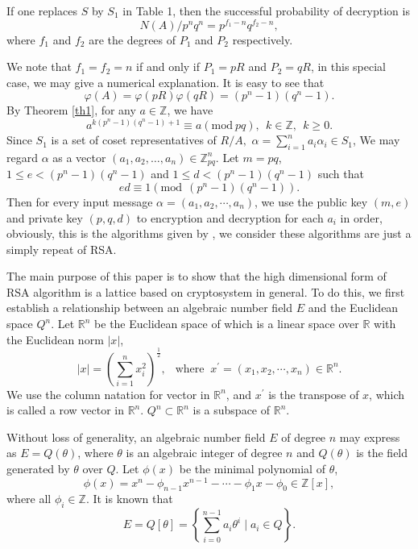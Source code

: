 \documentclass [11pt]{article}
\begin{document}
If one replaces $S$ by $S_{1}$ in Table 1, then the successful probability of  decryption is
\begin{equation}\label{1.6}
N(A) / p^{n} q^{n}=p^{f_{1}-n} q^{f_{2}-n},
\end{equation}
where  $f_{1}$ and $f_{2}$ are the  degrees  of $P_{1}$ and $P_{2}$ respectively.

We note that $f_{1}=f_{2}=n$ if and only if $P_{1}=p R$ and
$P_{2}=q R$, in this special case, we may give a numerical explanation. It is easy to see that
$$
\varphi(A)=\varphi(p R) \varphi(q R)=\left(p^{n}-1\right)\left(q^{n}-1\right).
$$
By Theorem \ref{th1}, for any $ a \in \mathbb{Z}$, we have
\begin{equation}\label{1.7}
a^{k\left(p^{n}-1\right)\left(q^{n}-1\right)+1} \equiv a (\text{mod}\ pq),\ \ k \in \mathbb{Z},\ \ k\geq 0.
\end{equation}
Since $S_{1}$ is a set of coset representatives of $R/A,$ $\alpha=\sum_{i=1}^{n}a_{i}\alpha_{i}\in S_{1}$,
We may regard  $\alpha$ as a vector  $\left(a_{1}, a_{2}, \ldots, a_{n}\right) \in \mathbb{Z}_{pq}^{n}$. Let $m =pq$, $1 \leq e<\left(p^{n}-1\right)\left(q^{n}-1\right)$ and $1 \leqslant d<\left(p^{n}-1\right)\left(q^{n}-1\right)$ such that
$$
ed\equiv 1(\text{mod}\ \ (p^{n}-1)(q^{n}-1)).
$$
Then for every input message $\alpha=\left(a_{1}, a_{2}, \cdots,a_{n}\right)$, we use the public key $(m,e) $ and private key $(p,q, d)$  to
 encryption and decryption for each  $a_{i}$ in order, obviously, this is the algorithms given by \cite{T}, we consider these algorithms
 are just a simply repeat of RSA.

The main purpose of this paper is to show that the high dimensional form of  RSA algorithm is a lattice based on cryptosystem in general. To do this, we first establish a relationship  between an algebraic number field $E$ and the Euclidean space $Q^{n}$. Let $\mathbb{R}^{n}$ be the Euclidean space of which is a linear space over $\mathbb{R}$  with the Euclidean  norm $|x|$,
\begin{equation}\label{1.8}
|x|=\left(\sum_{i=1}^{n} x_{i}^{2}\right)^{\frac{1}{2}},\ \  \text { where }\  x^{\prime}=\left(x_{1}, x_{2}, \cdots, x_{n}\right) \in \mathbb{R}^{n}.
\end{equation}
We use the column natation for vector in $\mathbb{R}^{n}$, and $x^{\prime}$ is the transpose  of $x$, which is called a row vector in $\mathbb{R}^{n}$. $Q^{n} \subset \mathbb{R}^{n}$ is a subspace of $\mathbb{R}^{n}.$

Without loss of  generality, an algebraic number  field $E$ of degree $n$ may express as $E=Q(\theta)$, where $\theta$ is an algebraic integer of degree $n$  and $Q(\theta)$ is the field generated by $\theta$ over $Q$.  Let $\phi(x)$ be the minimal polynomial of $\theta$,
\begin{equation}\label{1.9}
\phi(x)=x^{n}-\phi_{n-1} x^{n-1}-\cdots-\phi_{1} x-\phi_{0} \in \mathbb{Z}[x],
\end{equation}
where all $\phi_{i} \in \mathbb{Z}.$ It is known that
\begin{equation}\label{1.10}
E=Q[\theta]=\left\{\sum_{i=0}^{n-1} a_{i} \theta^{i} \mid a_{i} \in Q \right\} .
\end{equation}
\end{document}
